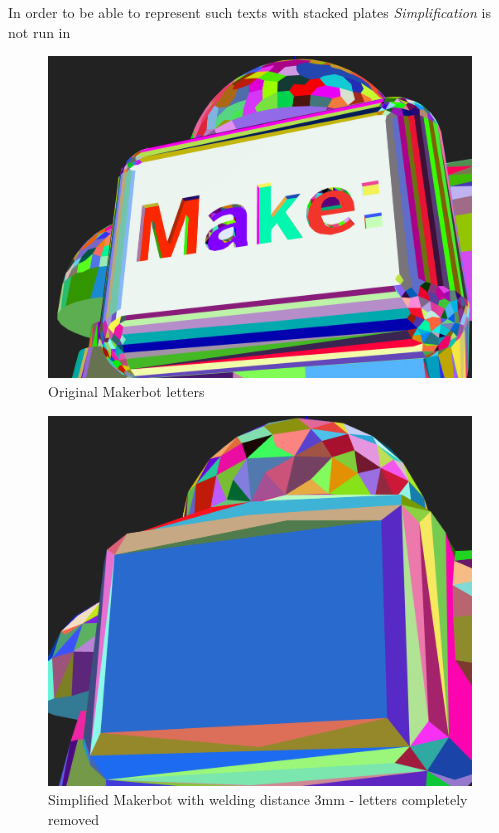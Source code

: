 \documentclass[../ClassicThesis.tex]{subfiles}
\begin{document}
In order to be able to represent such texts with stacked plates \emph{Simplification} is not run in 


\begin{figure}
\includegraphics[width=0.8\columnwidth]{Images/04-approx-welding-make-unwelded.png}
\caption{Original Makerbot letters}
\label{fig:origMakerbotMake}
\end{figure}

\begin{figure}
\includegraphics[width=0.8\columnwidth]{Images/04-approx-welding-make-3mm.png}
\caption{Simplified Makerbot with welding distance 3mm - letters completely removed}
\label{fig:3mmMakerbotMake}
\end{figure}
\end{document}
